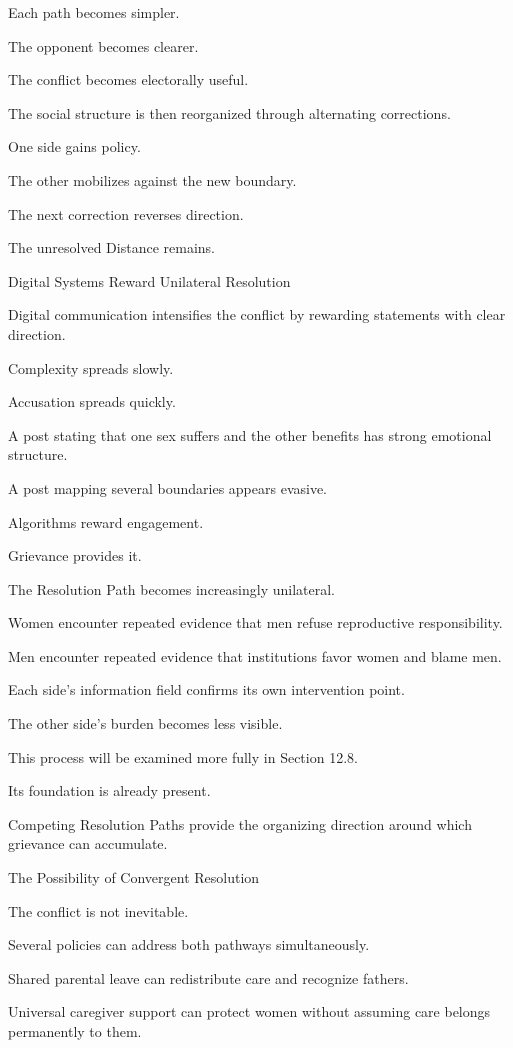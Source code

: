 Each path becomes simpler.

The opponent becomes clearer.

The conflict becomes electorally useful.

The social structure is then reorganized through alternating corrections.

One side gains policy.

The other mobilizes against the new boundary.

The next correction reverses direction.

The unresolved Distance remains.

Digital Systems Reward Unilateral Resolution

Digital communication intensifies the conflict by rewarding statements with clear direction.

Complexity spreads slowly.

Accusation spreads quickly.

A post stating that one sex suffers and the other benefits has strong emotional structure.

A post mapping several boundaries appears evasive.

Algorithms reward engagement.

Grievance provides it.

The Resolution Path becomes increasingly unilateral.

Women encounter repeated evidence that men refuse reproductive responsibility.

Men encounter repeated evidence that institutions favor women and blame men.

Each side’s information field confirms its own intervention point.

The other side’s burden becomes less visible.

This process will be examined more fully in Section 12.8.

Its foundation is already present.

Competing Resolution Paths provide the organizing direction around which grievance can accumulate.

The Possibility of Convergent Resolution

The conflict is not inevitable.

Several policies can address both pathways simultaneously.

Shared parental leave can redistribute care and recognize fathers.

Universal caregiver support can protect women without assuming care belongs permanently to them.

